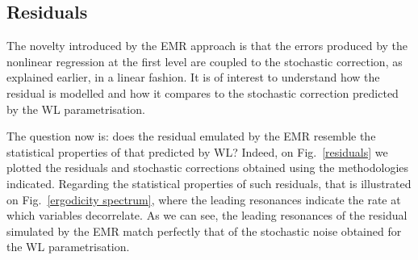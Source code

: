 \documentclass[12pt]{article}
\begin{document}
\subsection{Residuals}

The novelty introduced by the EMR approach is that the errors produced by the nonlinear regression at the first level are coupled to the stochastic correction, as explained earlier, in a linear fashion. It is of interest to understand how the residual is modelled and how it compares to the stochastic correction predicted by the WL parametrisation.

The question now is: does the residual emulated by the EMR resemble the statistical properties of that predicted by WL? Indeed, on Fig.~\ref{residuals} we plotted the residuals and stochastic corrections obtained using the methodologies indicated. Regarding the statistical properties of such residuals, that is illustrated on Fig.~\ref{ergodicity spectrum}, where the leading resonances indicate the rate at which variables decorrelate. As we can see, the leading resonances of the residual simulated by the EMR match perfectly that of the stochastic noise obtained for the WL parametrisation.
\end{document}
